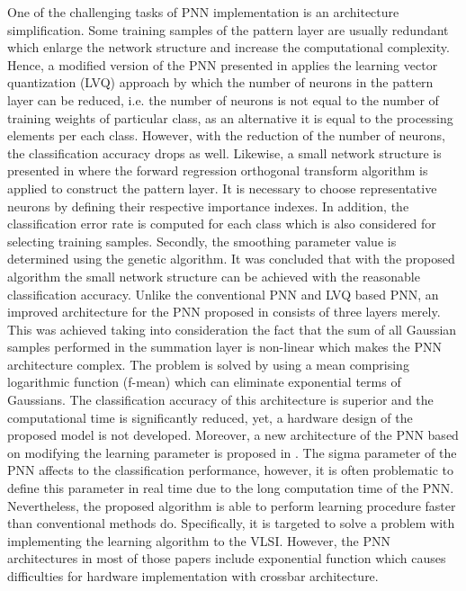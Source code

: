 \documentclass[sigconf]{acmart}
\begin{document}
One of the challenging tasks of PNN implementation is an architecture simplification. Some training samples of the pattern layer are usually redundant which enlarge the network structure and increase the computational complexity. Hence, a modified version of the PNN presented in \cite{burrascano1991learning} applies the learning vector quantization (LVQ) approach by which the number of neurons in the pattern layer can be reduced, i.e. the number of neurons is not equal to the number of training weights of particular class, as an alternative it is equal to the processing elements per each class. However, with the reduction of the number of neurons, the classification accuracy drops as well. Likewise, a small network structure is presented in \cite{mao2000probabilistic} where the forward regression orthogonal transform algorithm is applied to construct the pattern layer. It is necessary to choose representative neurons by defining their respective importance indexes. In addition, the classification error rate is computed for each class which is also considered for selecting training samples. Secondly, the smoothing parameter value is determined using the genetic algorithm. It was concluded that with the proposed algorithm the small network structure can be achieved with the reasonable classification accuracy. Unlike the conventional PNN and LVQ based PNN, an improved architecture for the PNN proposed in \cite{chandra2011improved} consists of three layers merely. This was achieved taking into consideration the fact that the sum of all Gaussian samples performed in the summation layer is non-linear which makes the PNN architecture complex. The problem is solved by using a mean comprising logarithmic function (f-mean) which can eliminate exponential terms of Gaussians. The classification accuracy of this architecture is superior and the computational time is significantly reduced, yet, a hardware design of the proposed model is not developed. Moreover, a new architecture of the PNN based on modifying the learning parameter is proposed in \cite{aibe2002probabilistic}. The sigma parameter of the PNN affects to the classification performance, however, it is often problematic to define this parameter in real time due to the long computation time of the PNN. Nevertheless, the proposed algorithm is able to perform learning procedure faster than conventional methods do. Specifically, it is targeted to solve a problem with implementing the learning algorithm to the VLSI. However, the PNN architectures in most of those papers include exponential function which causes difficulties for hardware implementation with crossbar architecture.
\end{document}
